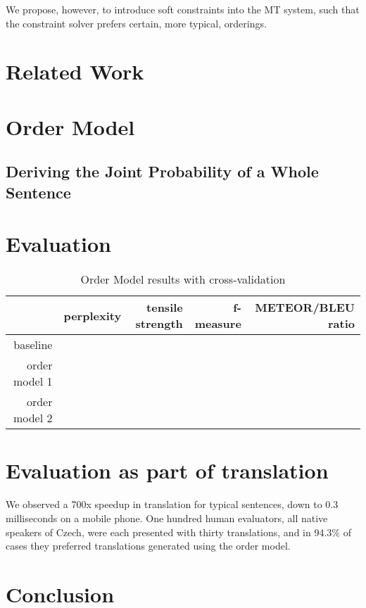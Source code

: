 \documentclass[11pt]{article}
\begin{document}
We propose, however, to introduce soft constraints into the MT system, such
that the constraint solver prefers certain, more typical, orderings.

\section{Related Work}

\section{Order Model}

\subsection{Deriving the Joint Probability of a Whole Sentence}

\section{Evaluation}

\begin{table*}[t!]
  \begin{center}
    \begin{tabular}{|r|r|r|r|r|}
      \hline
                    &perplexity&tensile strength&f-measure&METEOR/BLEU ratio \\
      \hline
      baseline      & & & &  \\
      order model 1 & & & &  \\
      order model 2 & & & &  \\
      \hline
    \end{tabular}
  \caption{Order Model results with cross-validation}
  \label{table:results}
  \end{center}
\end{table*}

\section{Evaluation as part of translation}
We observed a 700x speedup in translation for typical sentences, down to 0.3
milliseconds on a mobile phone. One hundred human evaluators, all native
speakers of Czech, were each presented with thirty translations, and in 94.3\%
of cases they preferred translations generated using the order model.

\section{Conclusion}


{}
\end{document}
